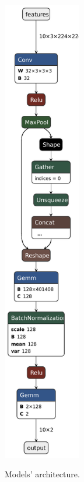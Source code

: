 \documentclass[runningheads]{llncs}
\begin{document}
\begin{figure}[h]
{\includegraphics[width=0.30\textwidth]{Models/EnhancedCNN.pdf}
}
\label{SimpleCNNs}
\caption{Models' architecture.}
\end{figure}
%
%
%
% 
% 
\end{document}
